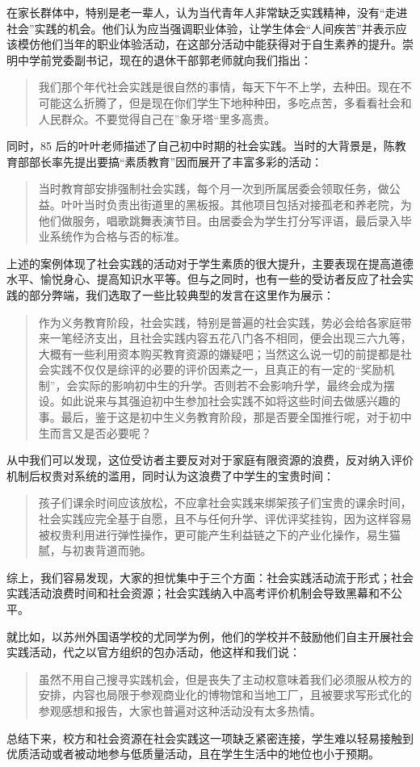 \documentclass[12pt,UTF8]{ctexart}
\begin{document}
\par {
	
	在家长群体中，特别是老一辈人，认为当代青年人非常缺乏实践精神，没有“走进社会”实践的机会。他们认为应当强调职业体验，让学生体会“人间疾苦”并表示应该模仿他们当年的职业体验活动，在这部分活动中能获得对于自生素养的提升。崇明中学前党委副书记，现在的退休干部郭老师就向我们指出：
	\begin{quote}
		\kaishu
		我们那个年代社会实践是很自然的事情，每天下午不上学，去种田。现在不可能这么折腾了，但是现在你们学生下地种种田，多吃点苦，多看看社会和人民群众。不要觉得自己在”象牙塔“里多高贵。
	\end{quote}
	同时，85 后的叶叶老师描述了自己初中时期的社会实践。当时的大背景是，陈教育部部长率先提出要搞“素质教育”因而展开了丰富多彩的活动：
	\begin{quote}
		\kaishu
		当时教育部安排强制社会实践，每个月一次到所属居委会领取任务，做公益。叶叶当时负责出街道里的黑板报。其他项目包括对接孤老和养老院，为他们做服务，唱歌跳舞表演节目。由居委会为学生打分写评语，最后录入毕业系统作为合格与否的标准。
	\end{quote}
	
	上述的案例体现了社会实践的活动对于学生素质的很大提升，主要表现在提高道德水平、愉悦身心、提高知识水平等。但与之同时，也有一些的受访者反应了社会实践的部分弊端，我们选取了一些比较典型的发言在这里作为展示：
	\begin{quote}
		\kaishu
		作为义务教育阶段，社会实践，特别是普遍的社会实践，势必会给各家庭带来一笔经济支出，且社会实践内容五花八门各不相同，便会出现三六九等，大概有一些利用资本购买教育资源的嫌疑吧；当然这么说一切的前提都是社会实践不仅仅是综评的必要的评价因素之一，且真正的有一定的“奖励机制”，会实际的影响初中生的升学。否则若不会影响升学，最终会成为摆设。如此说来与其强迫初中生参加社会实践不如将这些时间去做感兴趣的事。最后，鉴于这是初中生义务教育阶段，那是否要全国推行呢，对于初中生而言又是否必要呢？
	\end{quote}
	从中我们可以发现，这位受访者主要反对对于家庭有限资源的浪费，反对纳入评价机制后权贵对系统的滥用，同时认为这浪费了中学生的宝贵时间：
	\begin{quote}
		\kaishu
		孩子们课余时间应该放松，不应拿社会实践来绑架孩子们宝贵的课余时间，社会实践应完全基于自愿，且不与任何升学、评优评奖挂钩，因为这样容易被权贵利用进行弹性操作，更可能产生利益链之下的产业化操作，易生猫腻，与初衷背道而驰。
	\end{quote}
	综上，我们容易发现，大家的担忧集中于三个方面：社会实践活动流于形式；社会实践活动浪费时间和社会资源；社会实践纳入中高考评价机制会导致黑幕和不公平。
}
\par {
	就比如，以苏州外国语学校的尤同学为例，他们的学校并不鼓励他们自主开展社会实践活动，代之以官方组织的包办活动，他这样和我们说：
	\begin{quote}
		\kaishu
		虽然不用自己搜寻实践机会，但是丧失了主动权意味着我们必须服从校方的安排，内容也局限于参观商业化的博物馆和当地工厂，且被要求写形式化的参观感想和报告，大家也普遍对这种活动没有太多热情。
	\end{quote}
	总结下来，校方和社会资源在社会实践这一项缺乏紧密连接，学生难以轻易接触到优质活动或者被动地参与低质量活动，且在学生生活中的地位也小于预期。
}
\end{document}
